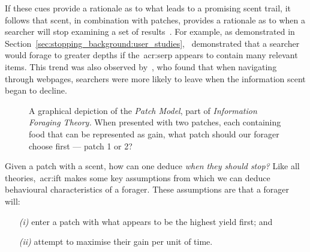 If these cues provide a rationale as to what leads to a promising scent trail, it follows that scent, in combination with patches, provides a rationale as to when a searcher will stop examining a set of results~\citep{pirolli1999ift, wu2012dc, wu2014information_scent}. For example, as demonstrated in Section~\ref{sec:stopping_background:user_studies},~\cite{wu2014information_scent} demonstrated that a searcher would forage to greater depths if the~\gls{acr:serp} appears to contain many relevant items. This trend was also observed by~\cite{card2001scent_graphs}, who found that when navigating through webpages, searchers were more likely to leave when the information scent began to decline.

\begin{figure}[t!]
    \centering
    \caption[The Patch Model]{A graphical depiction of the \emph{Patch Model}, part of \emph{Information Foraging Theory.} When presented with two patches, each containing food that can be represented as gain, what patch should our forager choose first — patch 1 or 2?}
    \label{fig:patch_model}
\end{figure}

\noindent
{}
Given a patch with a scent, how can one deduce \emph{when they should stop?} Like all theories,~\gls{acr:ift} makes some key assumptions from which we can deduce behavioural characteristics of a forager. These assumptions are that a forager will:

\begin{itemize}
    \item[\emph{(i)}]{enter a patch with what appears to be the highest yield first; and}
    \item[\emph{(ii)}]{attempt to maximise their gain per unit of time.}
\end{itemize}

